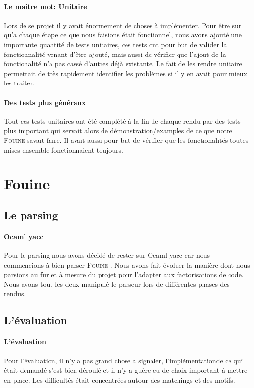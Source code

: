 \documentclass[14pt,a4paper]{extarticle}
\newcommand{\fouine}{\textsc{Fouine }}
\begin{document}
\paragraph{Le maitre mot: Unitaire}
Lors de se projet il y avait énormement de choses à implémenter.
Pour être sur qu'a chaque étape ce que nous faisions était fonctionnel,
nous avons ajouté une importante quantité de tests unitaires, ces tests
ont pour but de valider la fonctionnalité venant d'être ajouté, mais aussi
de vérifier que l'ajout de la fonctionalité n'a pas cassé d'autres déjà
existante. Le fait de les rendre unitaire permettait de très rapidement
identifier les problèmes si il y en avait pour mieux les traiter.

\paragraph{Des tests plus généraux}
Tout ces tests unitaires ont été complété à la fin de chaque rendu par des tests
plus important qui servait alors de démonstration/examples de ce que notre \fouine
savait faire. Il avait aussi pour but de vérifier que les fonctionalités toutes mises
ensemble fonctionnaient toujours.

\section{Fouine}

\subsection{Le parsing}

\paragraph{Ocaml yacc}
Pour le parsing nous avons décidé de rester sur Ocaml yacc car
nous commencions à bien parser \fouine. Nous avons fait évoluer la manière
dont nous parsions au fur et à mesure du projet pour l'adapter aux factorisations
de code. Nous avons tout les deux manipulé le parseur lors de différentes phases des rendus.

\subsection{L'évaluation}

\paragraph{L'évaluation}
Pour l'évaluation, il n'y a pas grand chose a signaler, l'implémentationde ce qui était
demandé s'est bien déroulé et il n'y a guère eu de choix important à mettre en place. Les
difficultés était concentrées autour des matchings et des motifs.
\end{document}
